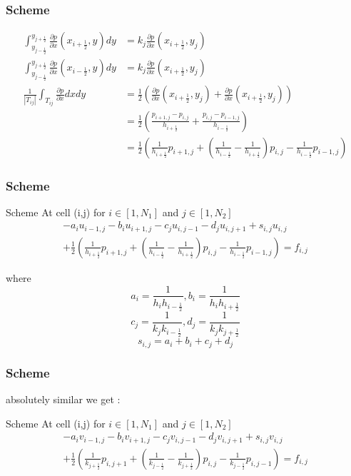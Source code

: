 \documentclass[11pt]{beamer}
\numberwithin{equation}{section}
\theoremstyle{plain}
\theoremstyle{definition}
\theoremstyle{remark}
\begin{document}
\begin{frame}\frametitle{Scheme}
\begin{align*}
\int_{y_{j-\frac{1}{2}}}^{y_{j+\frac{1}{2}}} \frac{\partial p}{\partial x}(x_{i+\frac{1}{2}},y)dy &= k_j\frac{\partial p}{\partial x}(x_{i+\frac{1}{2}},y_j) \\
 \int_{y_{j-\frac{1}{2}}}^{y_{j+\frac{1}{2}}} \frac{\partial p}{\partial x}(x_{i-\frac{1}{2}},y)dy &= k_j\frac{\partial p}{\partial x}(x_{i+\frac{1}{2}},y_j) \\
\frac{1}{|T_{ij}|}\int_{T_{ij}} \frac{\partial p}{\partial x}dxdy &= \frac{1}{2} \left ( \frac{\partial p}{\partial x}(x_{i+\frac{1}{2}},y_j) + \frac{\partial p}{\partial x}(x_{i+\frac{1}{2}},y_j) \right ) \\
&= \frac{1}{2} \left ( \frac{p_{i+1,j}-p_{i,j}}{h_{i+\frac{1}{2}}} + \frac{p_{i,j}-p_{i-1,j}}{h_{i-\frac{1}{2}}} \right ) \\
&= \frac{1}{2} \left ( \frac{1}{h_{i+\frac{1}{2}}}p_{i+1,j} +(\frac{1}{h_{i-\frac{1}{2}}}-\frac{1}{h_{i+\frac{1}{2}}})p_{i,j}-\frac{1}{h_{i-\frac{1}{2}}}p_{i-1,j}  \right ) 
\end{align*} 
\end{frame}
\begin{frame} \frametitle{Scheme}
\begin{block}{Scheme}
At cell (i,j) for $i \in [1,N_1]$ and $j\in [1,N_2]$
\begin{align*}
-a_iu_{i-1,j}-b_iu_{i+1,j}-c_ju_{i,j-1}-d_ju_{i,j+1}+s_{i,j}u_{i,j} \\
+\frac{1}{2} \left ( \frac{1}{h_{i+\frac{1}{2}}}p_{i+1,j} +(\frac{1}{h_{i-\frac{1}{2}}}-\frac{1}{h_{i+\frac{1}{2}}})p_{i,j}-\frac{1}{h_{i-\frac{1}{2}}}p_{i-1,j}  \right ) =f_{i,j}
\end{align*} 
\end{block}
where 
$$a_i=\frac{1}{h_ih_{i-\frac{1}{2}}},b_i=\frac{1}{h_ih_{i+\frac{1}{2}}}$$
$$c_j=\frac{1}{k_jk_{i-\frac{1}{2}}},d_j=\frac{1}{k_jk_{j+\frac{1}{2}}}$$
$$s_{i,j}=a_i+b_i+c_j+d_j$$
\end{frame}
\begin{frame}\frametitle{Scheme}
absolutely similar we get :
\begin{block}{Scheme}
At cell (i,j) for $i \in [1,N_1]$ and $j\in [1,N_2]$
\begin{align*}
-a_iv_{i-1,j}-b_iv_{i+1,j}-c_jv_{i,j-1}-d_jv_{i,j+1}+s_{i,j}v_{i,j} \\
+\frac{1}{2} \left ( \frac{1}{k_{j+\frac{1}{2}}}p_{i,j+1} +(\frac{1}{k_{j-\frac{1}{2}}}-\frac{1}{k_{j+\frac{1}{2}}})p_{i,j}-\frac{1}{k_{j-\frac{1}{2}}}p_{i,j-1}  \right ) =f_{i,j}
\end{align*}   
\end{block}
\end{frame}
\end{document}
